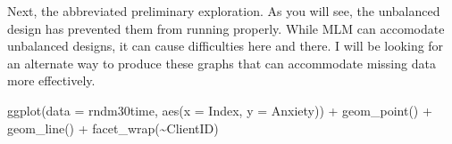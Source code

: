 \documentclass[
  english,
]{book}
\newenvironment{Shaded}{\begin{snugshade}}{\end{snugshade}}
\newcommand{\AttributeTok}[1]{\textcolor[rgb]{0.77,0.63,0.00}{#1}}
\newcommand{\FunctionTok}[1]{\textcolor[rgb]{0.00,0.00,0.00}{#1}}
\newcommand{\NormalTok}[1]{#1}
\newcommand{\SpecialCharTok}[1]{\textcolor[rgb]{0.00,0.00,0.00}{#1}}
\begin{document}
Next, the abbreviated preliminary exploration. As you will see, the unbalanced design has prevented them from running properly. While MLM can accomodate unbalanced designs, it can cause difficulties here and there. I will be looking for an alternate way to produce these graphs that can accommodate missing data more effectively.

\begin{Shaded}
\begin{Highlighting}[]
\FunctionTok{ggplot}\NormalTok{(}\AttributeTok{data =}\NormalTok{ rndm30time, }\FunctionTok{aes}\NormalTok{(}\AttributeTok{x =}\NormalTok{ Index, }\AttributeTok{y =}\NormalTok{ Anxiety)) }\SpecialCharTok{+} \FunctionTok{geom\_point}\NormalTok{() }\SpecialCharTok{+} \FunctionTok{geom\_line}\NormalTok{() }\SpecialCharTok{+}
    \FunctionTok{facet\_wrap}\NormalTok{(}\SpecialCharTok{\textasciitilde{}}\NormalTok{ClientID)}
\end{Highlighting}
\end{Shaded}
\end{document}
